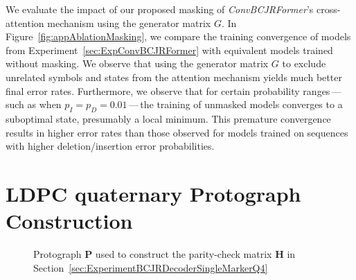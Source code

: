 \documentclass[conference,letterpaperu]{IEEEtran}
\newcommand{\pdel}{\ensuremath{p_D}}
\newcommand{\pins}{\ensuremath{p_I}}
\newcommand{\pc}{\ensuremath{\bm{H}}}
\begin{document}
We evaluate the impact of our proposed masking of \textit{ConvBCJRFormer}'s cross-attention mechanism using the generator matrix $G$. In Figure~\ref{fig:appAblationMasking}, we compare the training convergence of models from Experiment~\ref{sec:ExpConvBCJRFormer} with equivalent models trained without masking. We observe that using the generator matrix $G$ to exclude unrelated symbols and states from the attention mechanism yields much better final error rates. Furthermore, we observe that for certain probability ranges\,---\,such as when $\pins = \pdel = 0.01$\,---\,the training of unmasked models converges to a suboptimal state, presumably a local minimum. This premature convergence results in higher error rates than those observed for models trained on sequences with higher deletion/insertion error probabilities.

\section{LDPC quaternary Protograph Construction}
\label{sec:appQuartProtographConstruction}
\begin{figure}[h]
    \centering
    \caption{Protograph $\bm{P}$ used to construct the parity-check matrix $\pc$ in Section~\ref{sec:ExperimentBCJRDecoderSingleMarkerQ4}}
    \label{fig:ldpc-protograph}
\end{figure}
\end{document}
